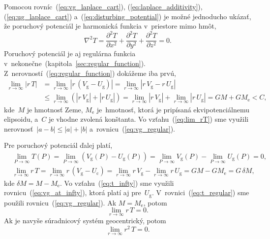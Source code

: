 \documentclass[a4paper, 12pt]{book}
\newcommand{\gidx}{\mathrm g}
\newcommand{\cidx}{\mathrm c}
\begin{document}
Pomocou rovníc~(\ref{eq:vg_laplace_cart}), (\ref{eq:laplace_additivity}), 
(\ref{eq:ug_laplace_cart}) a~(\ref{eq:disturbing_potential}) je možné 
jednoducho ukázať, že poruchový potenciál je harmonická funkcia v~priestore 
mimo hmôt,
%
\begin{equation}
\label{eq:laplace_xyz_t}
\nabla^2 T = \frac{\partial^2 T}{\partial x^2} + \frac{\partial^2 T}{\partial 
y^2} + \frac{\partial^2 T}{\partial z^2} = 0{.}
\end{equation}
%
Poruchový potenciál je aj regulárna funkcia 
v~nekonečne~(kapitola~\ref{sec:regular_function}).  
Z~nerovností~(\ref{eq:regular_function}) dokážeme iba prvú,
%
\begin{equation}
\label{eq:lim_rT}
\begin{split}
\lim_{r \rightarrow \infty} \left| r \, T \right| &= \lim_{r \rightarrow 
\infty} \left| r \,  \left( V_\gidx - U_\gidx \right) \right| = \lim_{r 
\rightarrow \infty} \left| r \, V_\gidx - r \, U_\gidx \right|\\
%
&\leq \lim_{r \rightarrow \infty} \left( \left| r \, V_\gidx \right| + \left| 
r \, U_\gidx \right| \right) = \lim_{r \rightarrow \infty} \left| r \, V_\gidx 
\right| + \lim_{r \rightarrow \infty} \left| r \, U_\gidx \right| = GM 
+ GM_\mathrm{e} < C{,}
\end{split}
\end{equation}
%
kde~$M$ je hmotnosť Zeme, $M_\mathrm{e}$ je~hmotnosť, ktorá je pripísaná 
ekvipotenciálnemu elipsoidu, a~$C$ je vhodne zvolená konštanta.  Vo 
vzťahu~(\ref{eq:lim_rT}) sme využili nerovnosť~$| a - b | \leq |a| + |b|$ 
a~rovnicu~(\ref{eq:vg_regular}).

Pre poruchový potenciál ďalej platí,
%
\begin{align}
\label{eq:t_infty}
&\lim_{P \rightarrow \infty} T(P) = \lim_{P \rightarrow \infty} (V_\gidx(P) 
- U_\gidx(P)) = \lim_{P \rightarrow \infty} V_\gidx(P) - \lim_{P \rightarrow 
\infty} U_\gidx(P) = 0{,}\\
%
\label{eq:t_regular}
&\lim_{r \rightarrow \infty} r \, T = \lim_{r \rightarrow \infty} r \, (V_\gidx 
 - U_\cidx) = \lim_{r \rightarrow \infty} r \, V_\gidx - \lim_{r \rightarrow 
 \infty} r \, U_\gidx = GM - GM_{\mathrm{e}} = G \, \delta M{,}
\end{align}
%
kde $\delta M = M - M_\mathrm{e}$.  Vo vzťahu~(\ref{eq:t_infty}) sme využili 
rovnicu~(\ref{eq:vg_at_infty}), ktorá platí aj pre~$U_\gidx$.  
V~rovnici~(\ref{eq:t_regular}) sme použili rovnicu~(\ref{eq:vg_regular}).  Ak 
$M = M_\mathrm{e}$, potom
%
\begin{equation}
\lim_{r \rightarrow \infty} r \, T = 0{.}
\end{equation}
%
Ak je navyše súradnicový systém geocentrický, potom \parencite{Pick1973}
%
\begin{equation}
\lim_{r \rightarrow \infty} r^2 \, T = 0{.}
\end{equation}
\end{document}
